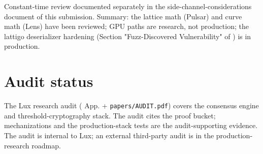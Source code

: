 \documentclass[11pt,a4paper]{article}
\begin{document}
Constant-time review documented separately in the side-channel-considerations document of this submission. Summary: the lattice math (Pulsar) and curve math (Lens) have been reviewed; GPU paths are research, not production; the lattigo deserializer hardening (Section "Fuzz-Discovered Vulnerability" of \cite{luxwarpv2}) is in production.

\section{Audit status}

The Lux research audit (\cite{quasarcertsoundness} App. + \texttt{papers/AUDIT.pdf}) covers the consensus engine and threshold-cryptography stack. The audit cites the proof bucket; mechanizations and the production-stack tests are the audit-supporting evidence. The audit is internal to Lux; an external third-party audit is in the production-research roadmap.



\end{document}
